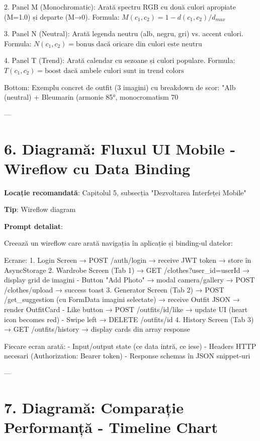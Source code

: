 2. Panel M (Monochromatic): Arată spectru RGB cu două culori apropiate (M=1.0) și departe (M→0). Formula: $M(c_1, c_2) = 1 - d(c_1, c_2) / d_{max}$

3. Panel N (Neutral): Arată legenda neutru (alb, negru, gri) vs. accent culori. Formula: $N(c_1, c_2) = \text{bonus dacă oricare din culori este neutru}$

4. Panel T (Trend): Arată calendar cu sezoane și culori populare. Formula: $T(c_1, c_2) = \text{boost dacă ambele culori sunt in trend colors}$

Bottom: Exemplu concret de outfit (3 imagini) cu breakdown de scor: "Alb (neutral) + Bleumarin (armonie 85°, monocromatism 70%

---

\section{6. Diagramă: Fluxul UI Mobile - Wireflow cu Data Binding}

\textbf{Locație recomandată}: Capitolul 5, subsecția "Dezvoltarea Interfeței Mobile"

\textbf{Tip}: Wireflow diagram

\textbf{Prompt detaliat}:

Creează un wireflow care arată navigația în aplicație și binding-ul datelor:

Ecrane:
1. Login Screen → POST /auth/login → receive JWT token → store în AsyncStorage
2. Wardrobe Screen (Tab 1) → GET /clothes?user_id={userId} → display grid de imagini
   - Button "Add Photo" → modal camera/gallery → POST /clothes/upload → success toast
3. Generator Screen (Tab 2) → POST /get_suggestion (cu FormData imagini selectate) → receive Outfit JSON → render OutfitCard
   - Like button → POST /outfits/{id}/like → update UI (heart icon becomes red)
   - Swipe left → DELETE /outfits/{id}
4. History Screen (Tab 3) → GET /outfits/history → display cards din array response

Fiecare ecran arată:
- Input/output state (ce data intră, ce iese)
- Headers HTTP necesari (Authorization: Bearer {token})
- Response schemas în JSON snippet-uri

---

\section{7. Diagramă: Comparație Performanță - Timeline Chart}

